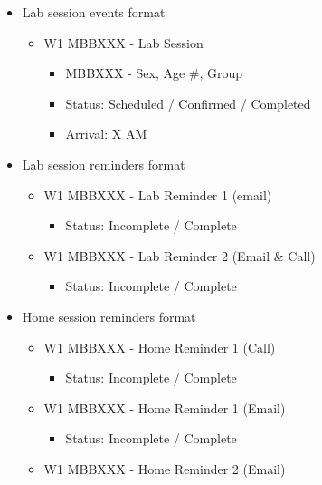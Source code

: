 \documentclass[]{book}
\providecommand{\tightlist}{%
  \setlength{\itemsep}{0pt}\setlength{\parskip}{0pt}}
\begin{document}
\begin{itemize}
\tightlist
\item
  Lab session events format

  \begin{itemize}
  \tightlist
  \item
    W1 MBBXXX - Lab Session

    \begin{itemize}
    \tightlist
    \item
      MBBXXX - Sex, Age \#, Group
    \item
      Status: Scheduled / Confirmed / Completed
    \item
      Arrival: X AM
    \end{itemize}
  \end{itemize}
\item
  Lab session reminders format

  \begin{itemize}
  \tightlist
  \item
    W1 MBBXXX - Lab Reminder 1 (email)

    \begin{itemize}
    \tightlist
    \item
      Status: Incomplete / Complete
    \end{itemize}
  \item
    W1 MBBXXX - Lab Reminder 2 (Email \& Call)

    \begin{itemize}
    \tightlist
    \item
      Status: Incomplete / Complete
    \end{itemize}
  \end{itemize}
\item
  Home session reminders format

  \begin{itemize}
  \tightlist
  \item
    W1 MBBXXX - Home Reminder 1 (Call)

    \begin{itemize}
    \tightlist
    \item
      Status: Incomplete / Complete
    \end{itemize}
  \item
    W1 MBBXXX - Home Reminder 1 (Email)

    \begin{itemize}
    \tightlist
    \item
      Status: Incomplete / Complete
    \end{itemize}
  \item
    W1 MBBXXX - Home Reminder 2 (Email)


\end{itemize}
\end{itemize}
\end{document}
